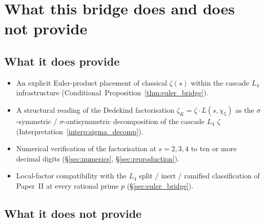 \documentclass[11pt,a4paper]{article}
\theoremstyle{definition}
\theoremstyle{remark}
\begin{document}
\section{What this bridge does and does not provide}\label{sec:scope}

\subsection{What it does provide}

\begin{itemize}
\item An explicit Euler-product placement of classical $\zeta(s)$
      within the cascade $L_4$ infrastructure
      (Conditional~Proposition~\ref{thm:euler_bridge}).
\item A structural reading of the Dedekind factorisation
      $\zeta_K = \zeta \cdot L(s, \chi_5)$ as the
      $\sigma$-symmetric / $\sigma$-antisymmetric decomposition of the
      cascade $L_4$ $\zeta$
      (Interpretation~\ref{interp:sigma_decomp}).
\item Numerical verification of the factorisation at
      $s = 2, 3, 4$ to ten or more decimal digits
      (\S\ref{sec:numerics}, \S\ref{sec:reproduction}).
\item Local-factor compatibility with the $L_4$ split / inert /
      ramified classification of Paper~II at every rational prime $p$
      (\S\ref{sec:euler_bridge}).
\end{itemize}

\subsection{What it does not provide}
\end{document}
